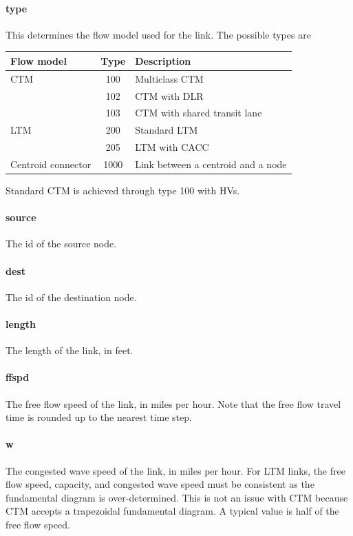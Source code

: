 \paragraph*{type} This determines the flow model used for the link. The possible types are
\begin{center}
\begin{tabular}{lcl}
\hline Flow model & Type & Description\\\hline
CTM & 100 & Multiclass CTM~\cite{levin2016multiclass} \\
& 102 & CTM with DLR~\cite{levin2016cell}\\
& 103 & CTM with shared transit lane\\\hline
LTM & 200 & Standard LTM~\cite{yperman2005link, yperman2007link}\\
& 205 & LTM with CACC\\\hline
Centroid connector & 1000 & Link between a centroid and a node\\\hline
\end{tabular}
\end{center}
Standard CTM is achieved through type 100 with HVs.
\paragraph*{source} The id of the source node.
\paragraph*{dest} The id of the destination node.
\paragraph*{length} The length of the link, in feet. 
\paragraph*{ffspd} The free flow speed of the link, in miles per hour. Note that the free flow travel time is rounded up to the nearest time step.
\paragraph*{w} The congested wave speed of the link, in miles per hour. For LTM links, the free flow speed, capacity, and congested wave speed must be consistent as the fundamental diagram is over-determined. This is not an issue with CTM because CTM accepts a trapezoidal fundamental diagram. A typical value is half of the free flow speed.
